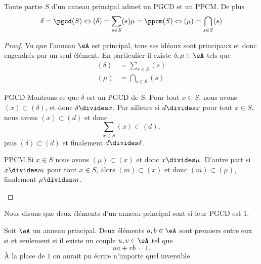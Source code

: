 \begin{theorem}
    Toute partie \( S\) d'un anneau principal admet un PGCD et un PPCM. De plus
    \begin{equation}
        \begin{aligned}[]
            \delta=\pgcd(S)\Leftrightarrow (\delta)=\sum_{s\in S}(s)
            \mu=\ppcm(S)\Leftrightarrow (\mu)=\bigcap_{s\in S}(s)
        \end{aligned}
    \end{equation}
\end{theorem}

\begin{proof}
    Vu que l'anneau \( \eA\) est principal, tous ses idéaux sont principaux et donc engendrés par un seul élément. En particulier il existe \( \delta,\mu\in \eA\) tels que
    \begin{subequations}
        \begin{align}
            (\delta)&=\sum_{s\in S}(s)\\
            (\mu)&=\bigcap_{s\in S}(s)
        \end{align}
    \end{subequations}
    \begin{subproof}
    \item[PGCD]
        Montrons ce que \( \delta\) est un PGCD de \( S\). Pour tout \( x\in S\), nous avons \( (x)\subset (\delta)\), et donc \( \delta\divides x\). Par ailleurs si \( d\divides x\) pour tout \( x\in S\), nous avons \( (x)\subset (d)\) et donc 
        \begin{equation}
            \sum_{x\in S}(x)\subset (d),
        \end{equation}
        puis \( (\delta)\subset (d)\) et finalement \( d\divides \delta\).
        \item[PPCM]
            Si \( x\in S\) nous avons \( (\mu)\subset (x)\) et donc \( x\divides \mu\). D'autre part si \( x\divides m\) pour tout \( x\in S\), alors \( (m)\subset (x)\) et donc \( (m)\subset(\mu)\), finalement \( \mu\divides m\).
    \end{subproof}
\end{proof}

Nous disons que deux éléments d'un anneau principal sont  si leur PGCD est \( 1\).

\begin{corollary}\label{CorimHyXy}
    Soit \( \eA\) un anneau principal. Deux éléments \( a,b\in \eA\) sont premiers entre eux si et seulement si il existe un couple \( u,v\in \eA\) tel que
    \begin{equation}
        ua+vb=1.
    \end{equation}
    À la place de \( 1\) on aurait pu écrire n'importe quel inversible.
\end{corollary}

